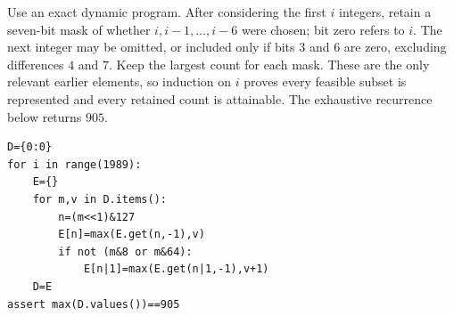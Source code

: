 Use an exact dynamic program. After considering the first $i$ integers, retain a seven-bit mask of whether $i,i-1,\ldots,i-6$ were chosen; bit zero refers to $i$. The next integer may be omitted, or included only if bits $3$ and $6$ are zero, excluding differences $4$ and $7$. Keep the largest count for each mask. These are the only relevant earlier elements, so induction on $i$ proves every feasible subset is represented and every retained count is attainable. The exhaustive recurrence below returns $\boxed{905}$.
\begin{verbatim}
D={0:0}
for i in range(1989):
    E={}
    for m,v in D.items():
        n=(m<<1)&127
        E[n]=max(E.get(n,-1),v)
        if not (m&8 or m&64):
            E[n|1]=max(E.get(n|1,-1),v+1)
    D=E
assert max(D.values())==905
\end{verbatim}
